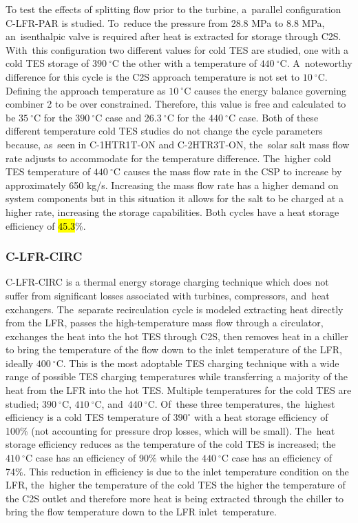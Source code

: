 \documentclass[sustainability,article,accept,moreauthors,pdftex]{Definitions/mdpi}
\begin{document}
\begin{paracol}{2}
To test the effects of splitting flow prior to the turbine, a~parallel configuration C-LFR-PAR is studied. To~reduce the pressure from 28.8 MPa to 8.8 MPa, an~isenthalpic valve is required after heat is extracted for storage through C2S. With~this configuration two different values for cold TES are studied, one with a cold TES storage of $390~^{\circ}$C the other with a temperature of $440~^{\circ}$C. A~noteworthy difference for this cycle is the C2S approach temperature is not set to $10~^{\circ}$C. Defining the approach temperature as $10~^{\circ}$C causes the energy balance governing combiner 2 to be over constrained. Therefore, this value is free and calculated to be $35~^{\circ}$C for the $390~^{\circ}$C case and $26.3~^{\circ}$C for the $440~^{\circ}$C case. Both of these different temperature cold TES studies do not change the cycle parameters because, as~seen in C-1HTR1T-ON and C-2HTR3T-ON, the~solar salt mass flow rate adjusts to accommodate for the temperature difference. The~higher cold TES temperature of $440~^{\circ}$C causes the mass flow rate in the CSP to increase by approximately 650 kg/s. Increasing the mass flow rate has a higher demand on system components but in this situation it allows for the salt to be charged at a higher rate, increasing the storage capabilities. Both cycles have a heat storage efficiency of \hl{45.3}\%.

\subsubsection{C-LFR-CIRC}

C-LFR-CIRC is a thermal energy storage charging technique which does not suffer from significant losses associated with turbines, compressors, and~heat exchangers. The~separate recirculation cycle is modeled extracting heat directly from the LFR, passes the high-temperature mass flow through a circulator, exchanges the heat into the hot TES through C2S, then removes heat in a chiller to bring the temperature of the flow down to the inlet temperature of the LFR, ideally $400~^{\circ}$C. This is the most adoptable TES charging technique with a wide range of possible TES charging temperatures while transferring a majority of the heat from the LFR into the hot TES. Multiple temperatures for the cold TES are studied; $390~^{\circ}$C, $410~^{\circ}$C, and~$440~^{\circ}$C. Of~these three temperatures, the~highest efficiency is a cold TES temperature of $390^{\circ}$ with a heat storage efficiency of 100\% (not accounting for pressure drop losses, which will be small). The~heat storage efficiency reduces as the temperature of the cold TES is increased; the $410~^{\circ}$C case has an efficiency of 90\% while the $440~^{\circ}$C case has an efficiency of 74\%. This reduction in efficiency is due to the inlet temperature condition on the LFR, the~higher the temperature of the cold TES the higher the temperature of the C2S outlet and therefore more heat is being extracted through the chiller to bring the flow temperature down to the LFR inlet~temperature. 


\end{paracol}
\end{document}
